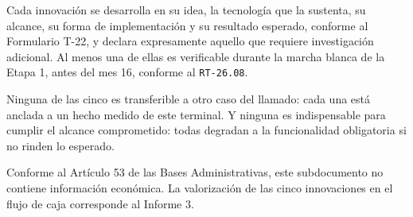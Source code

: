 Cada innovación se desarrolla en su idea, la tecnología que la sustenta, su
alcance, su forma de implementación y su resultado esperado, conforme al
Formulario T-22, y declara expresamente aquello que requiere investigación
adicional. Al menos una de ellas es verificable durante la marcha blanca de la
Etapa 1, antes del mes 16, conforme al \texttt{RT-26.08}.

\begin{bloquePropuesta}
Ninguna de las cinco es transferible a otro caso del llamado: cada una está
anclada a un hecho medido de este terminal. Y ninguna es indispensable para
cumplir el alcance comprometido: todas degradan a la funcionalidad obligatoria
si no rinden lo esperado.
\end{bloquePropuesta}

\noindent\small\textcolor{terabyteGris}{%
Conforme al Artículo 53\textdegree{} de las Bases Administrativas, este
subdocumento no contiene información económica. La valorización de las cinco
innovaciones en el flujo de caja corresponde al Informe 3.}

